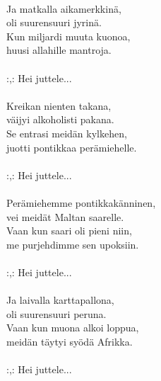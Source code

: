 \hspace{10mm} \\
        Ja matkalla aikamerkkinä, \\
        oli suurensuuri jyrinä. \\
        Kun miljardi muuta kuonoa, \\
        huusi allahille mantroja. \\
\hspace{10mm} \\
        :,: Hei juttele... \\
\hspace{10mm} \\
        Kreikan nienten takana, \\
        väijyi alkoholisti pakana. \\
        Se entrasi meidän kylkehen, \\
        juotti pontikkaa perämiehelle. \\
\hspace{10mm} \\
        :,: Hei juttele... \\
\hspace{10mm} \\
        Perämiehemme pontikkakänninen, \\
        vei meidät Maltan saarelle. \\
        Vaan kun saari oli pieni niin, \\
        me purjehdimme sen upoksiin. \\
\hspace{10mm} \\
        :,: Hei juttele... \\
\hspace{10mm} \\
        Ja laivalla karttapallona, \\
        oli suurensuuri peruna. \\
        Vaan kun muona alkoi loppua, \\
        meidän täytyi syödä Afrikka. \\
\hspace{10mm} \\
        :,: Hei juttele... \\
